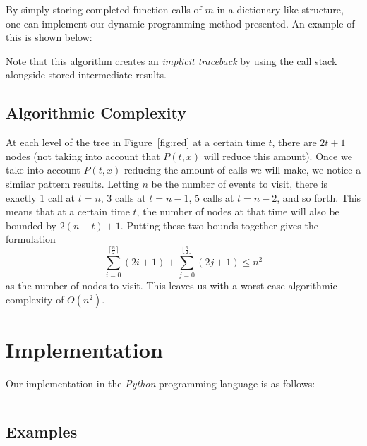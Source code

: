 \documentclass[titlepage,12pt]{article}
\let\le=\leqslant
\begin{document}
By simply storing completed function calls of $m$ in a dictionary-like
structure, one can implement our dynamic programming method presented. An
example of this is shown below:

\begin{algorithm}
\begin{algorithmic}
    \Else
    \EndIf
    \EndFunction
\end{algorithmic}
\end{algorithm}

Note that this algorithm creates an \emph{implicit traceback} by using the call
stack alongside stored intermediate results.

\subsection{Algorithmic Complexity}

At each level of the tree in Figure~\ref{fig:red} at a certain time $t$, there
are $2t + 1$ nodes (not taking into account that $P(t, x)$ will reduce this
amount). Once we take into account $P(t, x)$ reducing the amount of calls we
will make, we notice a similar pattern results. Letting $n$ be the number of
events to visit, there is exactly 1 call at $t = n$, 3 calls at $t = n -1$, 5
calls at $t = n - 2$, and so forth. This means that at a certain time $t$, the
number of nodes at that time will also be bounded by $2(n - t) + 1$. Putting
these two bounds together gives the formulation
\begin{displaymath}
    \sum_{i=0}^{\lceil \frac{n}{2} \rceil} (2i + 1) +
    \sum_{j=0}^{\lfloor \frac{n}{2} \rfloor} (2j + 1) \le n^2
\end{displaymath}
as the number of nodes to visit. This leaves us with a worst-case algorithmic
complexity of $O(n^2)$.

\section{Implementation}

Our implementation in the \emph{Python} programming language is as follows:

\inputminted{python3}{dp.py}

\subsection{Examples}


\end{document}
